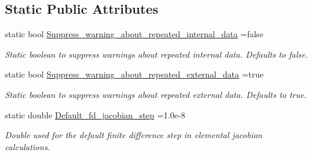 \subsection*{Static Public Attributes}
\begin{DoxyCompactItemize}
\item 
static bool \hyperlink{classoomph_1_1GeneralisedElement_acbfce11cb0f35821b108be5ec48c76d6}{Suppress\+\_\+warning\+\_\+about\+\_\+repeated\+\_\+internal\+\_\+data} =false
\begin{DoxyCompactList}\small\item\em Static boolean to suppress warnings about repeated internal data. Defaults to false. \end{DoxyCompactList}\item 
static bool \hyperlink{classoomph_1_1GeneralisedElement_a1bf8531f4b0ba0a0008e9a25af9b0b8b}{Suppress\+\_\+warning\+\_\+about\+\_\+repeated\+\_\+external\+\_\+data} =true
\begin{DoxyCompactList}\small\item\em Static boolean to suppress warnings about repeated external data. Defaults to true. \end{DoxyCompactList}\item 
static double \hyperlink{classoomph_1_1GeneralisedElement_a156163c9f6fbd17548a9fa836616d19b}{Default\+\_\+fd\+\_\+jacobian\+\_\+step} =1.\+0e-\/8
\begin{DoxyCompactList}\small\item\em Double used for the default finite difference step in elemental jacobian calculations. \end{DoxyCompactList}\end{DoxyCompactItemize}

